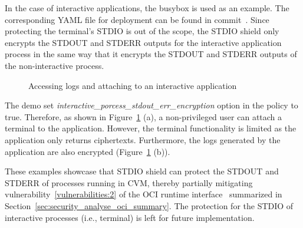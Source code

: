 In the case of interactive applications, the busybox is used as an example. The corresponding YAML file for deployment can be found in commit~\cite*{artifacts_busybox}. Since protecting the terminal's STDIO is out of the scope,  the STDIO shield 
only encrypts the STDOUT and STDERR outputs for the interactive application process in the same way that it encrypts the STDOUT and STDERR outputs of the non-interactive process.
\begin{figure}[!htb]



  \caption[Accessing logs and attaching to an interactive application ]{Accessing logs and attaching to an interactive application}
  \label{fig:qualitativ_interactive_process_stdio}
\end{figure}
The demo set \emph{interactive\_porcess\_stdout\_err\_encryption} option in the policy to true. Therefore, as shown in Figure~\ref{fig:qualitativ_interactive_process_stdio} (a),  a non-privileged user can attach a terminal to the application. However, the terminal functionality is limited as the application only returns 
ciphertexts. Furthermore, the logs generated by the application are also encrypted (Figure~\ref{fig:qualitativ_interactive_process_stdio} (b)). 


These examples showcase that STDIO shield can protect the STDOUT and STDERR of processes running in CVM, thereby partially mitigating vulnerability~\ref{vulnerabilities:2} of the OCI runtime interface~\cite*{oci-runtime-spec} summarized in Section~\ref{sec:security_analyse_oci_summary}. 
The protection for the STDIO of interactive processes (i.e., terminal) is left for future implementation.


